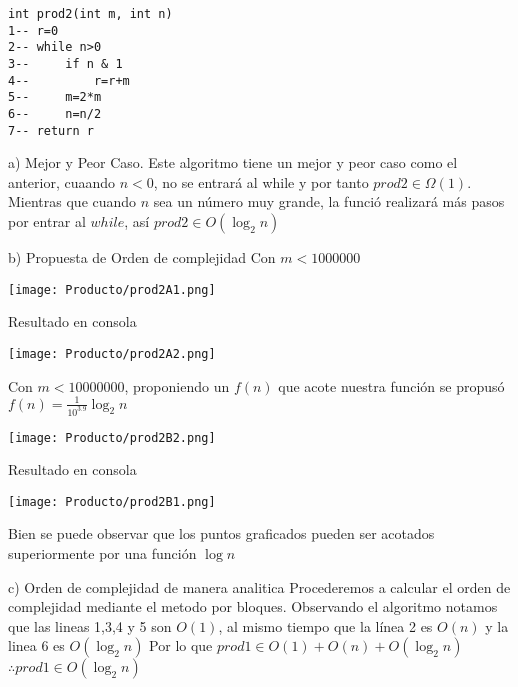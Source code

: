 \documentclass[12pt,twoside]{article}
\begin{document}
\begin{lstlisting}
int prod2(int m, int n)
1--	r=0
2--	while n>0
3--		if n & 1
4--			r=r+m
5--		m=2*m
6--		n=n/2
7--	return r
\end{lstlisting}
\newline
\begin{enumerate} a) Mejor y Peor Caso. \newline\newline
Este algoritmo tiene un mejor y peor caso como el anterior, cuaando $n < 0$, no se entrará al while y por tanto $prod2 \in \Omega(1)$. Mientras que cuando $n$ sea un número muy grande, la funció realizará más pasos por entrar al $while$, así $prod2 \in O(\log_2n)$
\end{enumerate}
\begin{enumerate} b) Propuesta de Orden de complejidad \newline\newline
Con $m < 1000000$
\begin{center}
    \texttt{[image: Producto/prod2A1.png]}
\end{center}
Resultado en consola
\begin{center}
    \texttt{[image: Producto/prod2A2.png]}
\end{center}
Con $m < 10000000$, proponiendo un $f(n)$ que acote nuestra función se propusó $f(n) = \frac{1}{10^3.9}\log_2n$
\begin{center}
    \texttt{[image: Producto/prod2B2.png]}
\end{center}
Resultado en consola
\begin{center}
    \texttt{[image: Producto/prod2B1.png]}
\end{center}
\end{enumerate}
Bien se puede observar que los puntos graficados pueden ser acotados superiormente por una función $\log n$
 \begin{enumerate} c) Orden de complejidad de manera anal\´itica
     \newline\newline
Procederemos a calcular el orden de complejidad mediante el m\´etodo por bloques.
Observando el algoritmo notamos que las lineas 1,3,4 y 5 son $O(1)$, al mismo tiempo que la línea 2 es $O(n)$ y la linea 6 es $O(\log_2n)$\newline
Por lo que \newline
$prod1 \in O(1) + O(n) + O(\log_2n)$\newline
$\therefore prod1 \in O(\log_2n)$
 \end{enumerate}
\newline
\end{document}
